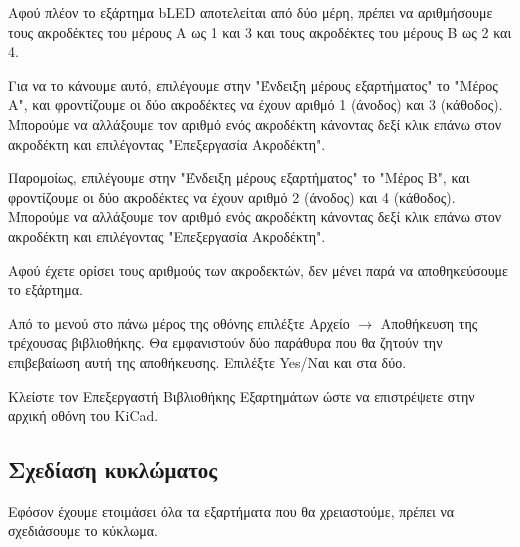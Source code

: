 \documentclass[a4paper]{article}
\begin{document}
Αφού πλέον το εξάρτημα b\textenglish{LED} αποτελείται από δύο μέρη, πρέπει να αριθμήσουμε τους ακροδέκτες του μέρους Α ως 1 και 3 και τους ακροδέκτες του μέρους Β ως 2 και 4.

Για να το κάνουμε αυτό, επιλέγουμε στην "Ένδειξη μέρους εξαρτήματος" το "Μέρος A", και φροντίζουμε οι δύο ακροδέκτες να έχουν αριθμό 1 (άνοδος) και 3 (κάθοδος). Μπορούμε να αλλάξουμε τον αριθμό ενός ακροδέκτη κάνοντας δεξί κλικ επάνω στον ακροδέκτη και επιλέγοντας "Επεξεργασία Ακροδέκτη".

Παρομοίως, επιλέγουμε στην "Ένδειξη μέρους εξαρτήματος" το "Μέρος B", και φροντίζουμε οι δύο ακροδέκτες να έχουν αριθμό 2 (άνοδος) και 4 (κάθοδος). Μπορούμε να αλλάξουμε τον αριθμό ενός ακροδέκτη κάνοντας δεξί κλικ επάνω στον ακροδέκτη και επιλέγοντας "Επεξεργασία Ακροδέκτη".

\begin{figure}
  \begin{center}
    \label{fig:kicad-main}
  \end{center}
\end{figure}

\begin{figure}
  \begin{center}
    \label{fig:kicad-main}
  \end{center}
\end{figure}

Αφού έχετε ορίσει τους αριθμούς των ακροδεκτών, δεν μένει παρά να αποθηκεύσουμε το εξάρτημα.

Από το μενού στο πάνω μέρος της οθόνης επιλέξτε Αρχείο $\rightarrow$ Αποθήκευση της τρέχουσας βιβλιοθήκης. Θα εμφανιστούν δύο παράθυρα που θα ζητούν την επιβεβαίωση αυτή της αποθήκευσης. Επιλέξτε Yes/Ναι και στα δύο.

Kλείστε τον Επεξεργαστή Βιβλιοθήκης Εξαρτημάτων ώστε να επιστρέψετε στην αρχική οθόνη του \textenglish{KiCad}.


\subsection{Σχεδίαση κυκλώματος}
Εφόσον έχουμε ετοιμάσει όλα τα εξαρτήματα που θα χρειαστούμε, πρέπει να σχεδιάσουμε το κύκλωμα. 
\end{document}
